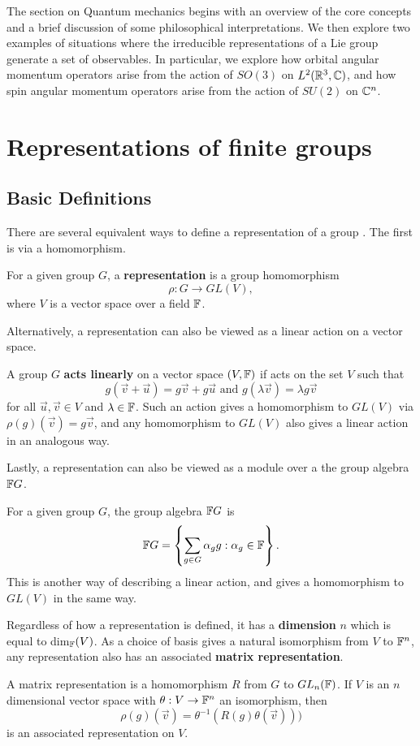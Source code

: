 \documentclass[a4paper]{article}
\begin{document}
The section on Quantum mechanics begins with an overview of the core concepts and a brief discussion of some philosophical interpretations. We then explore two examples of situations where the irreducible representations of a Lie group generate a set of observables. In particular, we explore how orbital angular momentum operators arise from the action of $SO(3)$ on $L^2(\mathbb{R}^3, \mathbb{C})$, and how spin angular momentum operators arise from the action of $SU(2)$ on $\mathbb{C}^n$.

\newpage
\section{Representations of finite groups}

\subsection{Basic Definitions}
There are several equivalent ways to define a representation of a group \cite{dexter}. The first is via a homomorphism. 
\begin{defi}[Representation]
    For a given group $G$, a \textbf{representation} is a group homomorphism $$\rho: G \to GL(V),$$ where $V$ is a vector space over a field $\mathbb{F}$. 
\end{defi}

Alternatively, a representation can also be viewed as a linear action on a vector space.
\begin{defi}
    A group $G$ \textbf{acts linearly} on a vector space $(V, \mathbb{F})$ if acts on the set $V$ such that $$g(\vec{v}+ \vec{u}) = g\vec{v} + g\vec{u} \text{ and } g(\lambda \vec{v}) = \lambda g\vec{v}$$
    for all $\vec{u}, \vec{v} \in V$ and $\lambda \in \mathbb{F}$. Such an action gives a homomorphism to $GL(V)$ via $\rho(g)(\vec{v}) = g\vec{v}$, and any homomorphism to $GL(V)$ also gives a linear action in an analogous way.
\end{defi}

Lastly, a representation can also be viewed as a module over a the group algebra $\mathbb{F} G$.
\begin{defi}
    For a given group $G$, the group algebra $\mathbb{F} G$ is 
    $$\mathbb{F} G = \left\{ \sum_{g \in G} \alpha_g g: \alpha_g \in \mathbb{F} \right\}.$$ This is another way of describing a linear action, and gives a homomorphism to $GL(V)$ in the same way.
\end{defi}

Regardless of how a representation is defined, it has a \textbf{dimension} $n$ which is equal to dim$_{\mathbb{F}}(V)$. As a choice of basis gives a natural isomorphism from $V$ to $\mathbb{F}^n$, any representation also has an associated \textbf{matrix representation}. 
\begin{defi}
    A matrix representation is a homomorphism $R$ from $G$ to $GL_n(\mathbb{F})$. If $V$ is an $n$ dimensional vector space with $\theta: V \to \mathbb{F}^n$ an isomorphism, then $$\rho(g)(\vec{v}) =  \theta^{-1}(R(g)\theta(\vec{v})))$$ is an associated representation on $V$. 
\end{defi}
\end{document}
